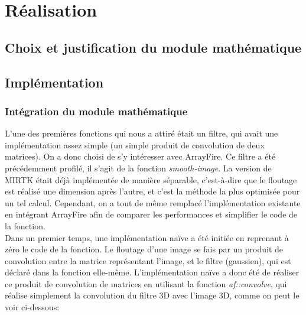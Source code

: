 \documentclass[10pt]{report}
\begin{document}
\chapter{Réalisation}
	\section{Choix et justification du module mathématique}

	
	\section{Implémentation}
	\subsection{Intégration du module mathématique}
	L'une des premières fonctions qui nous a attiré était un filtre, qui avait une implémentation assez simple (un simple produit de convolution de deux matrices). On a donc choisi de s'y intéresser avec ArrayFire.
	Ce filtre a été précédemment profilé, il s'agit de la fonction \textit{smooth-image}. La version de MIRTK était déjà implémentée de manière séparable, c'est-à-dire que le floutage est réalisé une dimension après l'autre, et c'est la méthode la plus optimisée pour un tel calcul. Cependant, on a tout de même remplacé l'implémentation existante en intégrant ArrayFire afin de comparer les performances et simplifier le code de la fonction. \\
	Dans un premier temps, une implémentation naïve a été initiée en reprenant à zéro le code de la fonction. Le floutage d'une image se fais par un produit de convolution entre la matrice représentant l'image, et le filtre (gaussien), qui est déclaré dans la fonction elle-même. L'implémentation naïve a donc été de réaliser ce produit de convolution de matrices en utilisant la fonction \textit{af::convolve}, qui réalise simplement la convolution du filtre 3D avec l'image 3D, comme on peut le voir ci-dessous:\\
\end{document}
